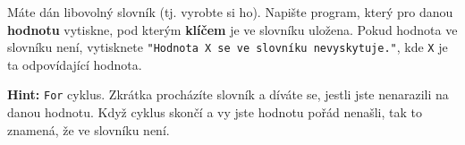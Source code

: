 \question[70]
Máte dán libovolný slovník (tj. vyrobte si ho). Napište program, který pro danou
\textbf{hodnotu} vytiskne, pod kterým \textbf{klíčem} je ve slovníku uložena.
Pokud hodnota ve slovníku není, vytisknete \texttt{"Hodnota X se ve slovníku
nevyskytuje."}, kde \texttt{X} je ta odpovídající hodnota.

\textbf{Hint:} \texttt{For} cyklus. Zkrátka procházíte slovník a díváte se,
jestli jste nenarazili na danou hodnotu. Když cyklus skončí a vy jste hodnotu
pořád nenašli, tak to znamená, že ve slovníku není.